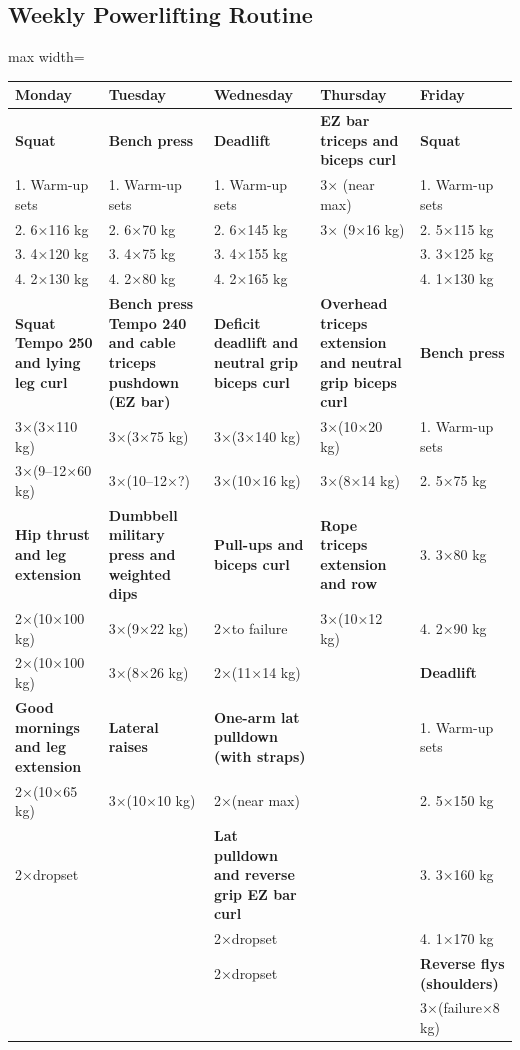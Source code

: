 \documentclass[a4paper,landscape]{article}
\begin{document}
\begin{center}
\section*{Weekly Powerlifting Routine}
\begin{adjustbox}{max width=\textwidth}
\begin{tabular}{|p{5cm}|p{5cm}|p{5cm}|p{5cm}|p{5cm}|}
\hline
\textbf{Monday} & \textbf{Tuesday} & \textbf{Wednesday} & \textbf{Thursday} & \textbf{Friday} \\
\hline
\textbf{Squat} & \textbf{Bench press} & \textbf{Deadlift} & \textbf{EZ bar triceps and biceps curl} & \textbf{Squat} \\
1. Warm-up sets & 1. Warm-up sets & 1. Warm-up sets & 3× (near max) & 1. Warm-up sets \\
2. 6×116 kg & 2. 6×70 kg & 2. 6×145 kg & 3× (9×16 kg) & 2. 5×115 kg \\
3. 4×120 kg & 3. 4×75 kg & 3. 4×155 kg & & 3. 3×125 kg \\
4. 2×130 kg & 4. 2×80 kg & 4. 2×165 kg & & 4. 1×130 kg \\
\textbf{Squat Tempo 250 and lying leg curl} & \textbf{Bench press Tempo 240 and cable triceps pushdown (EZ bar)} & \textbf{Deficit deadlift and neutral grip biceps curl} & \textbf{Overhead triceps extension and neutral grip biceps curl} & \textbf{Bench press} \\
3×(3×110 kg) & 3×(3×75 kg) & 3×(3×140 kg) & 3×(10×20 kg) & 1. Warm-up sets \\
3×(9–12×60 kg) & 3×(10–12×?) & 3×(10×16 kg) & 3×(8×14 kg) & 2. 5×75 kg \\
\textbf{Hip thrust and leg extension} & \textbf{Dumbbell military press and weighted dips} & \textbf{Pull-ups and biceps curl} & \textbf{Rope triceps extension and row} & 3. 3×80 kg \\
2×(10×100 kg) & 3×(9×22 kg) & 2×to failure & 3×(10×12 kg) & 4. 2×90 kg \\
2×(10×100 kg) & 3×(8×26 kg) & 2×(11×14 kg) & & \textbf{Deadlift} \\
\textbf{Good mornings and leg extension} & \textbf{Lateral raises} & \textbf{One-arm lat pulldown (with straps)} & & 1. Warm-up sets \\
2×(10×65 kg) & 3×(10×10 kg) & 2×(near max) & & 2. 5×150 kg \\
2×dropset & & \textbf{Lat pulldown and reverse grip EZ bar curl} & & 3. 3×160 kg \\
 & & 2×dropset & & 4. 1×170 kg \\
 & & 2×dropset & & \textbf{Reverse flys (shoulders)} \\
 & & & & 3×(failure×8 kg) \\
\hline
\end{tabular}
\end{adjustbox}
\end{center}
\end{document}
